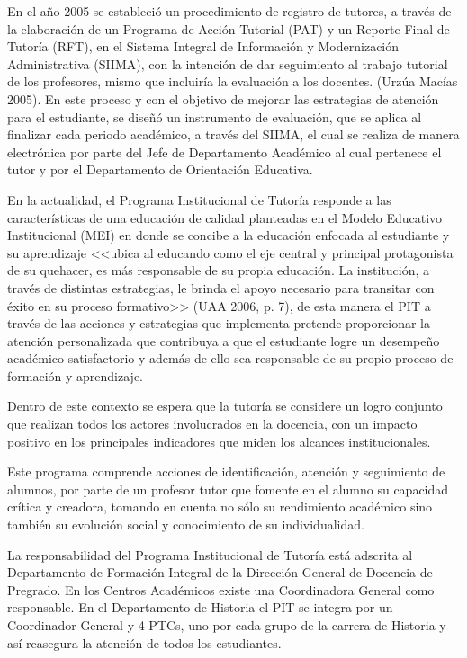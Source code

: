 En el año 2005 se estableció un procedimiento de registro de tutores, a
través de la elaboración de un Programa de Acción Tutorial (PAT) y un
Reporte Final de Tutoría (RFT), en el Sistema Integral de Información y
Modernización Administrativa (SIIMA), con la intención de dar seguimiento
al trabajo tutorial de los profesores, mismo que incluiría la evaluación a
los docentes. (Urzúa Macías 2005). En este proceso y con el objetivo de
mejorar las estrategias de atención para el estudiante, se diseñó un
instrumento de evaluación, que se aplica al finalizar cada periodo
académico, a través del SIIMA, el cual se realiza de manera electrónica por
parte del Jefe de Departamento Académico al cual pertenece el tutor y por
el Departamento de Orientación Educativa.

En la actualidad, el Programa Institucional de Tutoría responde a las
características de una educación de calidad planteadas en el Modelo
Educativo Institucional (MEI) en donde se concibe a la educación enfocada
al estudiante y su aprendizaje <<ubica al educando como el eje central y
principal protagonista de su quehacer, es más responsable de su propia
educación. La institución, a través de distintas estrategias, le brinda el
apoyo necesario para transitar con éxito en su proceso formativo>> (UAA
2006, p. 7), de esta manera el PIT a través de las acciones y estrategias que
implementa pretende proporcionar la atención personalizada que contribuya a
que el estudiante logre un desempeño académico satisfactorio y además de
ello sea responsable de su propio proceso de formación y aprendizaje.

Dentro de este contexto se espera que la tutoría se considere un logro
conjunto que realizan todos los actores involucrados en la docencia, con un
impacto positivo en los principales indicadores que miden los alcances
institucionales. 

Este programa comprende acciones de identificación, atención y seguimiento
de alumnos, por parte de un profesor tutor que fomente en el alumno su
capacidad crítica y creadora, tomando en cuenta no sólo su rendimiento
académico sino también su evolución social y conocimiento de su
individualidad. 
\enlargethispage{2\baselineskip}

La responsabilidad del Programa Institucional de Tutoría está adscrita al
Departamento de Formación Integral de la Dirección General de Docencia de
Pregrado. En los Centros Académicos existe una Coordinadora General como
responsable. En el Departamento de Historia el PIT se integra por un
Coordinador General y 4 PTCs, uno por cada grupo de la carrera de Historia
y así reasegura la atención de todos los estudiantes.

